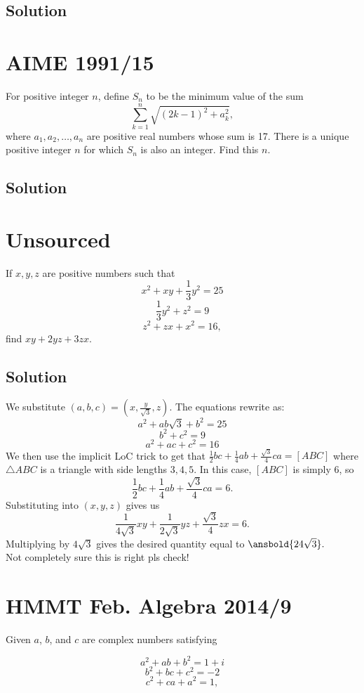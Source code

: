 \documentclass{article}
\begin{document}
\subsection{Solution}

\pagebreak\section{AIME 1991/15}
For positive integer $n$, define $S_n$ to be the minimum value of the sum\[ \sum_{k=1}^n \sqrt{(2k-1)^2+a_k^2}, \]where $a_1,a_2,\ldots,a_n$ are positive real numbers whose sum is 17. There is a unique positive integer $n$ for which $S_n$ is also an integer. Find this $n$.

\subsection{Solution}

\pagebreak\section{Unsourced}
If $x,y,z$ are positive numbers such that
    \[x^2+xy+\frac{1}{3}y^2=25\]
    \[\frac{1}{3}y^2+z^2=9\]
    \[z^2+zx+x^2=16,\]
    find $xy+2yz+3zx.$

\subsection{Solution}
We substitute $(a,b,c)=(x,\frac{y}{\sqrt{3}},z)$. The equations rewrite as:
$$a^2+ab\sqrt{3}+b^2=25$$
$$b^2+c^2=9$$
$$a^2+ac+c^2=16$$
We then use the implicit LoC trick to get that $\frac{1}{2}bc+\frac{1}{4}ab+\frac{\sqrt{3}}{4}ca=[ABC]$ where $\triangle ABC$ is a triangle with side lengths $3,4,5$. In this case, $[ABC]$ is simply $6$, so $$\frac{1}{2}bc+\frac{1}{4}ab+\frac{\sqrt{3}}{4}ca=6.$$
Substituting into $(x,y,z)$ gives us $$\frac{1}{4\sqrt{3}}xy+\frac{1}{2\sqrt{3}}yz+\frac{\sqrt{3}}{4}zx=6.$$ Multiplying by $4\sqrt{3}$ gives the desired quantity equal to $\ansbold{24\sqrt{3}}.$\\
Not completely sure this is right pls check!

\pagebreak\section{HMMT Feb. Algebra 2014/9}
Given $a$, $b$, and $c$ are complex numbers satisfying

\[ a^2+ab+b^2=1+i \]
\[ b^2+bc+c^2=-2 \]
\[ c^2+ca+a^2=1, \]
\end{document}

